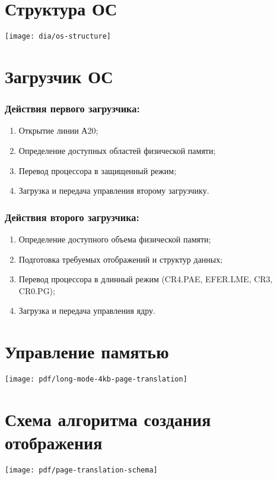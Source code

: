\documentclass[12pt]{article}
\begin{document}
\section{\textbf{Структура ОС}}
\begin{center}
\texttt{[image: dia/os-structure]}
\end{center}


\section{\textbf{Загрузчик ОС}}
\subsubsection{Действия первого загрузчика:}
\begin{enumerate}
\item Открытие линии А20;
\item Определение доступных областей физической памяти;
\item Перевод процессора в защищенный режим;
\item Загрузка и передача управления второму загрузчику.
\end{enumerate}

\subsubsection{Действия второго загрузчика:}
\begin{enumerate}
\item Определение доступного объема физической памяти;
\item Подготовка требуемых отображений и структур данных;
\item Перевод процессора в длинный режим (CR4.PAE, EFER.LME, CR3, CR0.PG);
\item Загрузка и передача управления ядру.
\end{enumerate}


\section{\textbf{Управление памятью}}
\texttt{[image: pdf/long-mode-4kb-page-translation]}


\section{\textbf{Схема алгоритма создания отображения}}
\begin{center}
\texttt{[image: pdf/page-translation-schema]}
\end{center}
\end{document}
